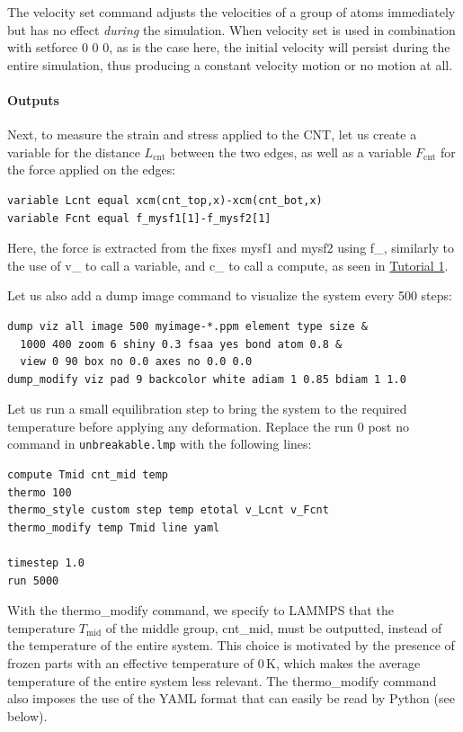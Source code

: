 \documentclass[9pt,tutorial]{livecoms}
\newcommand{\lmpcmd}[1]{\colorbox{listing}{\textcolor{command}{\small{#1}}}} %
\newcommand{\lmpcmdnote}[1]{\colorbox{note_listing}{\textcolor{command}{\small{#1}}}} %
\newcommand{\flecmd}[1]{\textcolor{command}{\texttt{#1}}} %
\begin{document}
\begin{note}
  The \lmpcmdnote{velocity set} command {\color{blue}adjusts} the velocities of
  a group of atoms {\color{blue}immediately} but {\color{blue}has no effect}
  \emph{during} the simulation.  When \lmpcmdnote{velocity set} is used
  in combination with \lmpcmdnote{setforce 0 0 0}, as is the case here, the
  initial velocity will persist during the entire simulation, thus producing
  a constant velocity {\color{blue} motion or no motion at all}.
\end{note}

\paragraph{Outputs}

Next, to measure the strain and stress applied to the CNT, let us create a
variable for the distance $L_\text{cnt}$ between the two edges,
as well as a variable $F_\text{cnt}$ for the force applied on the edges:
\begin{lstlisting}
variable Lcnt equal xcm(cnt_top,x)-xcm(cnt_bot,x)
variable Fcnt equal f_mysf1[1]-f_mysf2[1]
\end{lstlisting}
Here, the force is extracted from the fixes \lmpcmd{mysf1} and \lmpcmd{mysf2}
using \lmpcmd{f\_}, similarly to the use of \lmpcmd{v\_} to call a variable,
and \lmpcmd{c\_} to call a compute, as seen in \hyperref[lennard-jones-label]{Tutorial 1}.

Let us also add a \lmpcmd{dump image} command to visualize the system
every 500 steps:
\begin{lstlisting}
dump viz all image 500 myimage-*.ppm element type size &
  1000 400 zoom 6 shiny 0.3 fsaa yes bond atom 0.8 &
  view 0 90 box no 0.0 axes no 0.0 0.0
dump_modify viz pad 9 backcolor white adiam 1 0.85 bdiam 1 1.0
\end{lstlisting}
Let us run a small equilibration step to bring the system to the required
temperature before applying any deformation.  Replace the \lmpcmd{run 0 post no}
command in \flecmd{unbreakable.lmp} with the following lines:
\begin{lstlisting}
compute Tmid cnt_mid temp
thermo 100
thermo_style custom step temp etotal v_Lcnt v_Fcnt
thermo_modify temp Tmid line yaml

timestep 1.0
run 5000
\end{lstlisting}
With the \lmpcmd{thermo\_modify} command, we specify to LAMMPS that the
temperature $T_\mathrm{mid}$ of the middle group, \lmpcmd{cnt\_mid},
must be outputted, instead of the temperature of the entire system.
This choice is motivated by the presence of
frozen parts with an effective temperature of 0\,K, which makes the average
temperature of the entire system less relevant.  The \lmpcmd{thermo\_modify}
command also imposes the use of the YAML format that can easily be read by
Python (see below).
\end{document}
